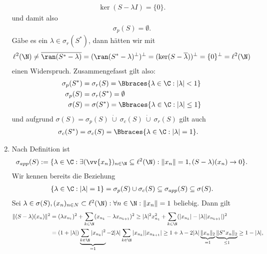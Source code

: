 \begin{solution}
\begin{enumerate}[label = (\alph*)]
  \begin{align*}
    \ker(S - \lambda I) = \{0\}.
  \end{align*}
  und damit also
  \begin{align*}
    \sigma_p(S) = \emptyset.
  \end{align*}
  Gäbe es ein $\lambda \in \sigma_r(S^*)$, dann hätten wir mit
  \begin{align*}
    \ell^2(\N) \neq \overline{\ran(S^* - \lambda)} = (\ran(S^* - \lambda)^{\bot})^{\bot} =
    (\ker(S - \overline{\lambda}))^{\bot} = \{0\}^{\bot} = \ell^2(\N)
  \end{align*}
  einen Widerspruch. Zusammengefasst gilt also:
  \begin{align*}
    \sigma_p(S^\ast) &= \sigma_r(S) = \Bbraces{\lambda \in \C: |\lambda| < 1} \\
    \sigma_p(S) &= \sigma_r(S^*) = \emptyset \\
    \sigma(S) &= \sigma(S^*) = \Bbraces{\lambda \in \C: |\lambda| \leq 1}
  \end{align*}
  und aufgrund $\sigma(S) = \sigma_p(S) ~\dot \cup~ \sigma_c(S) ~\dot \cup~ \sigma_r(S)$ gilt auch
  \begin{align*}
    \sigma_c(S^\ast) &= \sigma_c(S) = \Bbraces{\lambda \in \C: |\lambda| = 1}.
  \end{align*}
  \item Nach Definition ist
  \begin{align*}
    \sigma_{app}(S) := \{\lambda \in \C: \exists (\vv{x_n})_{n \in \N} \subseteq \ell^2(\N): \|x_n\| = 1, (S - \lambda)(x_n) \to 0\}.
  \end{align*}
  Wir kennen bereits die Beziehung
  \begin{align*}
    \{\lambda \in \C: |\lambda| = 1 \} = \sigma_p(S) \cup \sigma_c(S) \subseteq \sigma_{app}(S) \subseteq \sigma(S).
  \end{align*}
  Sei $\lambda \in \sigma(S), (x_n)_{n \in N} \subset \ell^2(\N): \forall n \in \N: \|x_n\| = 1$ beliebig. Dann gilt
  \begin{align*}
    \|(S - \lambda)(x_n)\|^2 &=  (\lambda x_{n_1})^2 + \sum_{k \in \N}(x_{n_k}- \lambda x_{n_{k+1}})^2
    \geq |\lambda|^2x_{n_1}^2 + \sum_{k \in \N}(|x_{n_k}|- |\lambda| |x_{n_{k+1}}|)^2 \\
    &= (1 + |\lambda|)\underbrace{\sum_{k \in \N}|x_{n_k}|^2}_{= 1} - 2|\lambda|\sum_{k \in \N}|x_{n_k}| |x_{n_{k+1}}|
    \geq 1 + \lambda - 2|\lambda|\underbrace{\|x_n\|_2}_{=1}\underbrace{\|S^*x_n\|_2}_{\leq 1} \geq 1 - |\lambda|,
  \end{align*}

\end{enumerate}
\end{solution}
